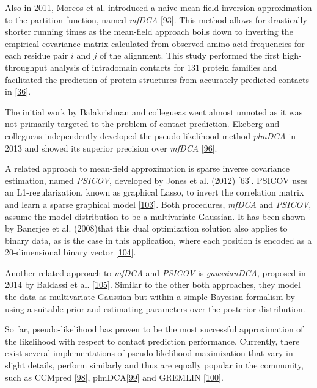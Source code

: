 \documentclass[11pt,a4paper,twoside]{book}
\theoremstyle{definition}
\theoremstyle{definition}
\theoremstyle{remark}
\begin{document}
Also in 2011, Morcos et al. introduced a naive mean-field inversion
approximation to the partition function, named \emph{mfDCA}
{[}\protect\hyperlink{ref-Morcos2011}{93}{]}. This method allows for
drastically shorter running times as the mean-field approach boils down
to inverting the empirical covariance matrix calculated from observed
amino acid frequencies for each residue pair \(i\) and \(j\) of the
alignment. This study performed the first high-throughput analysis of
intradomain contacts for 131 protein families and facilitated the
prediction of protein structures from accurately predicted contacts in
{[}\protect\hyperlink{ref-Marks2011}{36}{]}.

The initial work by Balakrishnan and collegueas went almost unnoted as
it was not primarily targeted to the problem of contact prediction.
Ekeberg and collegueas independently developed the pseudo-likelihood
method \emph{plmDCA} in 2013 and showed its superior precision over
\emph{mfDCA} {[}\protect\hyperlink{ref-Ekeberg2013}{96}{]}.

A related approach to mean-field approximation is sparse inverse
covariance estimation, named \emph{PSICOV}, developed by Jones et al.
(2012) {[}\protect\hyperlink{ref-Jones2012}{63}{]}. PSICOV uses an
L1-regularization, known as graphical Lasso, to invert the correlation
matrix and learn a sparse graphical model
{[}\protect\hyperlink{ref-Friedman2008}{103}{]}. Both procedures,
\emph{mfDCA} and \emph{PSICOV}, assume the model distribution to be a
multivariate Gaussian. It has been shown by Banerjee et al. (2008)that
this dual optimization solution also applies to binary data, as is the
case in this application, where each position is encoded as a
20-dimensional binary vector
{[}\protect\hyperlink{ref-Banerjee2008}{104}{]}.

Another related approach to \emph{mfDCA} and \emph{PSICOV} is
\emph{gaussianDCA}, proposed in 2014 by Baldassi et al.
{[}\protect\hyperlink{ref-Baldassi2014}{105}{]}. Similar to the other
both approaches, they model the data as multivariate Gaussian but within
a simple Bayesian formalism by using a suitable prior and estimating
parameters over the posterior distribution.

So far, pseudo-likelihood has proven to be the most successful
approximation of the likelihood with respect to contact prediction
performance. Currently, there exist several implementations of
pseudo-likelihood maximization that vary in slight details, perform
similarly and thus are equally popular in the community, such as CCMpred
{[}\protect\hyperlink{ref-Seemayer2014}{98}{]},
plmDCA{[}\protect\hyperlink{ref-Ekeberg2014}{99}{]} and GREMLIN
{[}\protect\hyperlink{ref-Kamisetty2013}{100}{]}.
\end{document}
